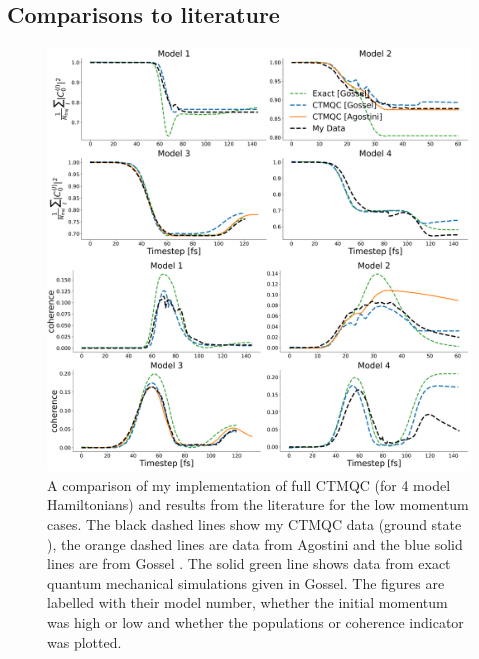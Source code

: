 \subsection{Comparisons to literature}
\begin{figure}[ht]
	\includegraphics[width=\textwidth]{../img/CTMQC/TullyModels/CTMQC_lowMom.png}
	\caption{\label{fig:LitCompCTMQCTullyLow}A comparison of my implementation of full CTMQC (for 4 model Hamiltonians) and results from the literature for the low momentum cases. The black dashed lines show my CTMQC data (ground state ), the orange dashed lines are data from Agostini \cite{agostini_quantum-classical_2016} and the blue solid lines are from Gossel \cite{gossel_coupled-trajectory_2018}. The solid green line shows data from exact quantum mechanical simulations given in Gossel. The figures are labelled with their model number, whether the initial momentum was high or low and whether the populations or coherence indicator was plotted.}
\end{figure}
